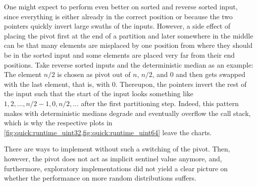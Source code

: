 One might expect \QS{} to perform even better on sorted and reverse sorted input, since everything is either already in the correct position or because the two pointers quickly invert large swaths of the inputs.
However, a side effect of placing the pivot first at the end of a partition and later somewhere in the middle can be that many elements are misplaced by one position from where they should be in the sorted input and some elements are placed very far from their end positions.
Take reverse sorted inputs and the deterministic median as an example:
The element \(n/2\) is chosen as pivot out of \(n\), \(n/2\), and \(0\) and then gets swapped with the last element, that is, with \(0\).
Thereupon, the pointers invert the rest of the input such that the start of the input looks something like \(1, 2, \dots, n/2-1, 0, n/2, \dots\) after the first partitioning step.
Indeed, this pattern makes \QS{} with deterministic medians degrade and eventually overflow the call stack, which is why the respective plots in \cref{fig:quick:runtime_uint32,fig:quick:runtime_uint64} leave the charts.

There are ways to implement \QS{} without such a switching of the pivot.
Then, however, the pivot does not act as implicit sentinel value anymore, and, furthermore, exploratory implementations did not yield a clear picture on whether the performance on more random distributions suffers.
